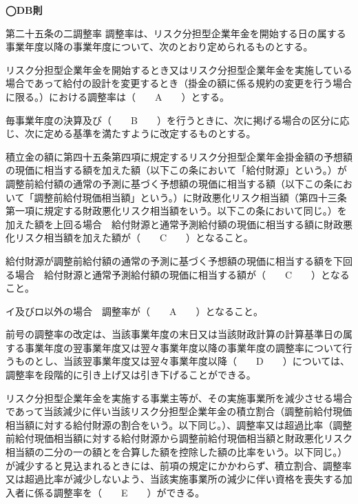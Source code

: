 \begin{fillblank}[年金2 2022 問題1(3)]
  \noindent \textbf{◯DB則}
  \begin{lawstructure}
    \begin{lawarticle}{第二十五条の二}{調整率}
      調整率は、リスク分担型企業年金を開始する日の属する事業年度以降の事業年度について、次のとおり定められるものとする。

      リスク分担型企業年金を開始するとき又はリスク分担型企業年金を実施している場合であって給付の設計を変更するとき（掛金の額に係る規約の変更を行う場合に限る。）における調整率は（　　A　　）とする。

      毎事業年度の決算及び（　　B　　）を行うときに、次に掲げる場合の区分に応じ、次に定める基準を満たすように改定するものとする。

      積立金の額に第四十五条第四項に規定するリスク分担型企業年金掛金額の予想額の現価に相当する額を加えた額（以下この条において「給付財源」という。）が調整前給付額の通常の予測に基づく予想額の現価に相当する額（以下この条において「調整前給付現価相当額」という。）に財政悪化リスク相当額（第四十三条第一項に規定する財政悪化リスク相当額をいう。以下この条において同じ。）を加えた額を上回る場合　給付財源と通常予測給付額の現価に相当する額に財政悪化リスク相当額を加えた額が（　　C　　）となること。

      給付財源が調整前給付額の通常の予測に基づく予想額の現価に相当する額を下回る場合　給付財源と通常予測給付額の現価に相当する額が（　　C　　）となること。

      イ及びロ以外の場合　調整率が（　　A　　）となること。

      前号の調整率の改定は、当該事業年度の末日又は当該財政計算の計算基準日の属する事業年度の翌事業年度又は翌々事業年度以降の事業年度の調整率について行うものとし、当該翌事業年度又は翌々事業年度以降（　　D　　）については、調整率を段階的に引き上げ又は引き下げることができる。

      リスク分担型企業年金を実施する事業主等が、その実施事業所を減少させる場合であって当該減少に伴い当該リスク分担型企業年金の積立割合（調整前給付現価相当額に対する給付財源の割合をいう。以下同じ。）、調整率又は超過比率（調整前給付現価相当額に対する給付財源から調整前給付現価相当額と財政悪化リスク相当額の二分の一の額とを合算した額を控除した額の比率をいう。以下同じ。）が減少すると見込まれるときには、前項の規定にかかわらず、積立割合、調整率又は超過比率が減少しないよう、当該実施事業所の減少に伴い資格を喪失する加入者に係る調整率を（　　E　　）ができる。
    \end{lawarticle}
  \end{lawstructure}
\end{fillblank}

